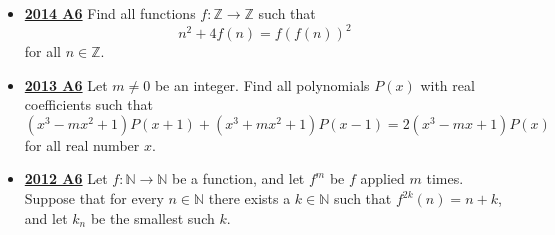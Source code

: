 \documentclass[11pt]{scrartcl}
\begin{document}
\begin{itemize}[leftmargin=*]
\item \href{https://artofproblemsolving.com/community/c6h1113182p5083542}{\textbf{2014 A6}} Find all functions $f : \mathbb{Z} \to\mathbb{ Z}$ such that
\[ n^2+4f(n)=f(f(n))^2 \]
for all $n\in \mathbb{Z}$. 
\item \href{https://artofproblemsolving.com/community/c6h597124p3543375}{\textbf{2013 A6}} 	Let $m \neq 0 $ be an integer. Find all polynomials $P(x) $ with real coefficients such that
\[ (x^3 - mx^2 +1 ) P(x+1)  + (x^3+mx^2+1) P(x-1) =2(x^3 - mx +1 ) P(x) \]
for all real number $x$.
\item \href{https://artofproblemsolving.com/community/c6h546166p3160555}{\textbf{2012 A6}} Let $f: \mathbb{N} \rightarrow \mathbb{N}$ be a function, and let $f^m$ be $f$ applied $m$ times. Suppose that for every $n \in \mathbb{N}$ there exists a $k \in \mathbb{N}$ such that $f^{2k}(n)=n+k$, and let $k_n$ be the smallest such $k$. 


\end{itemize}
\end{document}
